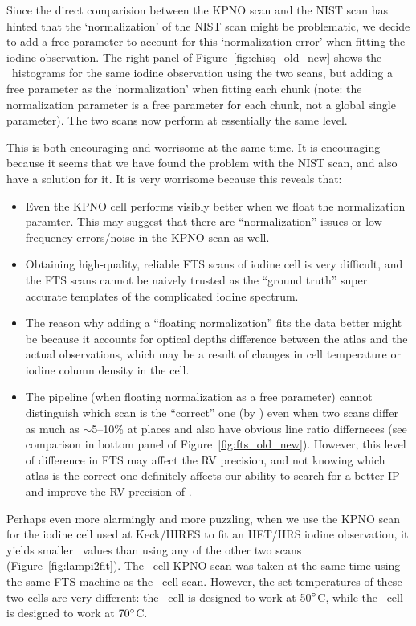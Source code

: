 Since the direct comparision between the KPNO scan and the NIST scan
has hinted that the `normalization' of the NIST scan might be
problematic, we decide to add a free parameter to account for this
`normalization error' when fitting the iodine observation. The right
panel of Figure~\ref{fig:chisq_old_new} shows the \chisq\ histograms
for the same iodine observation using the two scans, but adding a free
parameter as the `normalization' when fitting each chunk (note: the
normalization parameter is a free parameter for each chunk, not a
global single parameter). The two scans now perform at essentially the
same level.

This is both encouraging and worrisome at the same time. It is
encouraging because it seems that we have found the problem with the
NIST scan, and also have a solution for it. It is very worrisome
because this reveals that:
\begin{itemize}
  \item Even the KPNO cell performs visibly better when we float the
    normalization paramter. This may suggest that there are
    ``normalization'' issues or low frequency errors/noise in the KPNO
    scan as well.
  \item Obtaining high-quality, reliable FTS scans of iodine cell is
    very difficult, and the FTS scans cannot be naively trusted as the
    ``ground truth'' super accurate templates of the complicated iodine
    spectrum.
  \item The reason why adding a ``floating normalization'' fits the
    data better might be because it accounts for optical depths difference
    between the atlas and the actual observations, which may be a result
    of changes in cell temperature or iodine column density in the cell.
  \item The pipeline (when floating normalization as a free parameter)
    cannot distinguish which scan is the ``correct'' one (by \chisq)
    even when two scans differ as much as $\sim$5--10\% at places and
    also have obvious line ratio differneces (see comparison in bottom
    panel of Figure~\ref{fig:fts_old_new}). However, this level of
    difference in FTS may affect the RV precision, and not knowing
    which atlas is the correct one definitely affects our ability to
    search for a better IP and improve the RV precision of \het.
\end{itemize}  

Perhaps even more alarmingly and more puzzling, when we use the KPNO
scan for the iodine cell used at Keck/HIRES to fit an HET/HRS iodine
observation, it yields smaller \chisq\ values than using any of the
other two scans (Figure~\ref{fig:lampi2fit}). The \het\ cell KPNO scan
was taken at the same time using the same FTS machine as the \keck\
cell scan. However, the set-temperatures of these two cells are very
different: the \keck\ cell is designed to work at 50$^{\circ}$C, while
the \het\ cell is designed to work at $70^{\circ}$C.



